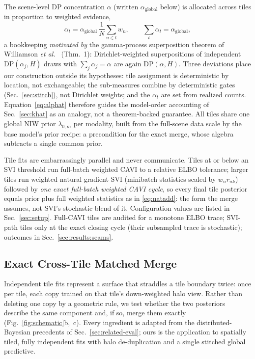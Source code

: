 The scene-level DP concentration $\alpha$ (written
$\alpha_{\mathrm{global}}$ below) is allocated across tiles in
proportion to weighted evidence,
\begin{equation}
\alpha_t = \alpha_{\mathrm{global}} \,
{\textstyle\frac{1}{N}\sum_{n \in t} w_n},
\qquad \textstyle\sum_t \alpha_t = \alpha_{\mathrm{global}},
\label{eq:alphat}
\end{equation}
a bookkeeping \emph{motivated by} the gamma-process superposition
theorem of Williamson \emph{et al.}~\cite{williamson2013parallel}
(Thm.~1): Dirichlet-weighted superpositions of independent
$\mathrm{DP}(\alpha_j, H)$ draws with $\sum_j \alpha_j = \alpha$ are
again $\mathrm{DP}(\alpha, H)$. Three deviations place our construction
outside its hypotheses: tile assignment is deterministic by
location, not exchangeable; the sub-measures combine by deterministic
gates (Sec.~\ref{sec:stitch}), not Dirichlet weights; and the
$\alpha_t$ are set from realized counts. Equation~\eqref{eq:alphat}
therefore guides the model-order accounting of
Sec.~\ref{sec:khat} as an analogy, not a theorem-backed guarantee.
All tiles share one global NIW prior $\lambda_{0,m}$ per modality,
built from the full-scene data scale by the base model's prior
recipe: a precondition for the exact merge, whose algebra subtracts
a single common prior.

 Tile fits are embarrassingly parallel and never communicate. Tiles at or
below an SVI threshold run full-batch weighted CAVI to a relative ELBO
tolerance; larger tiles run weighted natural-gradient SVI
(minibatch statistics scaled by $w_n r_{nk}$) followed by \emph{one exact
full-batch weighted CAVI cycle}, so every final tile posterior equals
prior plus full weighted statistics as in \eqref{eq:natadd}: the form
the merge assumes, not SVI's stochastic blend of it.
Configuration values are listed in Sec.~\ref{sec:setup}.
Full-CAVI tiles are audited for a monotone ELBO trace; SVI-path tiles
only at the exact closing cycle (their subsampled trace is
stochastic); outcomes in Sec.~\ref{sec:results:seams}.

\subsection{Exact Cross-Tile Matched Merge}
\label{sec:merge}

 Independent tile fits represent a surface that straddles a tile boundary
twice: once per tile, each copy trained on that tile's down-weighted
halo view. Rather than deleting one copy by a geometric rule, we test
whether the two posteriors describe the same component and, if so, merge
them exactly (Fig.~\ref{fig:schematic}b,~c). Every ingredient is
adapted from the distributed-Bayesian
precedents of Sec.~\ref{sec:related-eval}; ours is the application to
spatially tiled, fully independent fits with halo
de-duplication and a single stitched global predictive.

